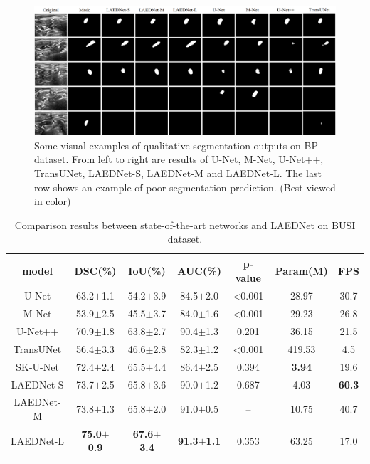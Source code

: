\documentclass[review]{elsarticle}
\begin{document}
\begin{figure}[!t]
	\includegraphics[width=\textwidth]{results-BP3.png}
	\centering
	\caption{Some visual examples of qualitative segmentation outputs on BP \cite{Kaggle} dataset. From left to right are results of U-Net\cite{2015U}, M-Net\cite{2018Joint}, U-Net++\cite{2020UNet}, TransUNet\cite{chen2021transunet}, LAEDNet-S, LAEDNet-M and LAEDNet-L. The last row shows an example of poor segmentation prediction. (Best viewed in color)}
	\label{fig5}
\end{figure}

\begin{table}[!t]
	\caption{Comparison results between state-of-the-art networks and LAEDNet on BUSI \cite{2019Dataset} dataset.}
	\centering
	\setlength{\tabcolsep}{3.2mm}
	\begin{tabular}{c|ccc|c|cc}
		\hline
		model & DSC(\%) & IoU(\%) & AUC(\%) & p-value &  Param(M) & FPS \\
		\hline
		U-Net \cite{2015U} & 63.2$\pm$1.1 & 54.2$\pm$3.9 & 84.5$\pm$2.0 & \textless0.001 & 28.97 & 30.7  \\
		\hline
		M-Net \cite{2019Deep} &	53.9$\pm$2.5 & 45.5$\pm$3.7 & 84.0$\pm$1.6 & \textless0.001 & 29.23 & 26.8 \\
		\hline
		U-Net++ \cite{2020UNet} & 70.9$\pm$1.8 & 63.8$\pm$2.7 & 90.4$\pm$1.3 & 0.201 & 36.15 & 21.5\\
		\hline
		TransUNet \cite{chen2021transunet} & 56.4$\pm$3.3 & 46.6$\pm$2.8 & 82.3$\pm$1.2 & \textless0.001 & 419.53 & 4.5 \\
		\hline
		SK-U-Net \cite{2020breastmass} & 72.4$\pm$2.4 & 65.5$\pm$4.4 & 86.4$\pm$2.5 & 0.394 & \textbf{3.94} & 19.6 \\
		\hline
		LAEDNet-S & 73.7$\pm$2.5 & 65.8$\pm$3.6 & 90.0$\pm$1.2 & 0.687 & 4.03 & \textbf{60.3} \\
		\hline
		LAEDNet-M & 73.8$\pm$1.3 & 65.8$\pm$2.0 & 91.0$\pm$0.5 & -- & 10.75 & 40.7 \\
		\hline
		LAEDNet-L & \textbf{75.0$\pm$0.9} & \textbf{67.6$\pm$3.4} & \textbf{91.3$\pm$1.1} & 0.353 & 63.25 & 17.0 \\
		\hline
	\end{tabular}\label{table3}
\end{table}
\end{document}
